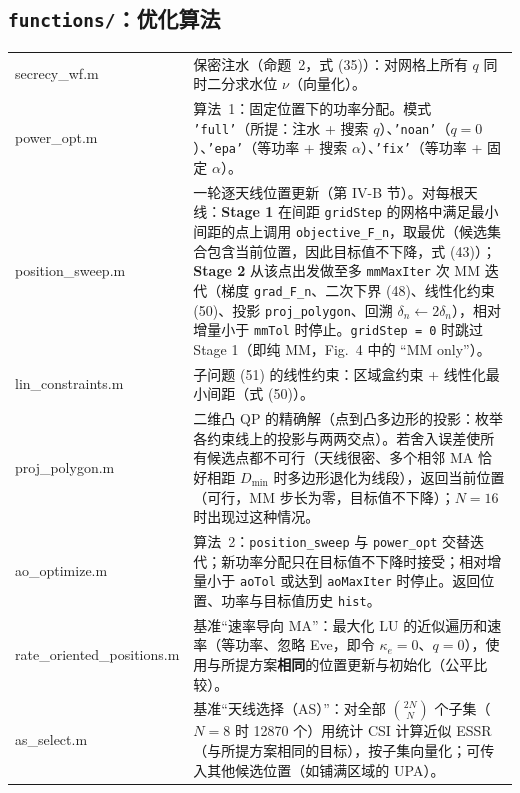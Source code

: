 \documentclass[11pt,a4paper]{ctexart}
\newcommand{\code}[1]{\texttt{#1}}
\begin{document}
\subsection{\code{functions/}：优化算法}
\begin{longtable}{>{\ttfamily\small}p{4.6cm}p{11.2cm}}
\toprule
secrecy\_wf.m & 保密注水（命题~2，式 (35)）：对网格上所有 $q$ 同时二分求水位 $\nu$（向量化）。\\
power\_opt.m & 算法~1：固定位置下的功率分配。模式 \code{'full'}（所提：注水 + 搜索 $q$）、\code{'noan'}（$q=0$）、\code{'epa'}（等功率 + 搜索 $\alpha$）、\code{'fix'}（等功率 + 固定 $\alpha$）。\\
position\_sweep.m & 一轮逐天线位置更新（第 IV-B 节）。对每根天线：\textbf{Stage 1} 在间距 \code{gridStep} 的网格中满足最小间距的点上调用 \code{objective\_F\_n}，取最优（候选集合包含当前位置，因此目标值不下降，式 (43)）；\textbf{Stage 2} 从该点出发做至多 \code{mmMaxIter} 次 MM 迭代（梯度 \code{grad\_F\_n}、二次下界 (48)、线性化约束 (50)、投影 \code{proj\_polygon}、回溯 $\delta_n\leftarrow2\delta_n$），相对增量小于 \code{mmTol} 时停止。\code{gridStep = 0} 时跳过 Stage 1（即纯 MM，Fig.~4 中的 “MM only”）。\\
lin\_constraints.m & 子问题 (51) 的线性约束：区域盒约束 + 线性化最小间距（式 (50)）。\\
proj\_polygon.m & 二维凸 QP 的精确解（点到凸多边形的投影：枚举各约束线上的投影与两两交点）。若舍入误差使所有候选点都不可行（天线很密、多个相邻 MA 恰好相距 $D_{\min}$ 时多边形退化为线段），返回当前位置（可行，MM 步长为零，目标值不下降）；$N=16$ 时出现过这种情况。\\
ao\_optimize.m & 算法~2：\code{position\_sweep} 与 \code{power\_opt} 交替迭代；新功率分配只在目标值不下降时接受；相对增量小于 \code{aoTol} 或达到 \code{aoMaxIter} 时停止。返回位置、功率与目标值历史 \code{hist}。\\
rate\_oriented\_positions.m & 基准“速率导向 MA”：最大化 LU 的近似遍历和速率（等功率、忽略 Eve，即令 $\kappa_e=0$、$q=0$），使用与所提方案\textbf{相同}的位置更新与初始化（公平比较）。\\
as\_select.m & 基准“天线选择（AS）”：对全部 $\binom{2N}{N}$ 个子集（$N=8$ 时 12870 个）用统计 CSI 计算近似 ESSR（与所提方案相同的目标），按子集向量化；可传入其他候选位置（如铺满区域的 UPA）。\\
\bottomrule
\end{longtable}
\end{document}
